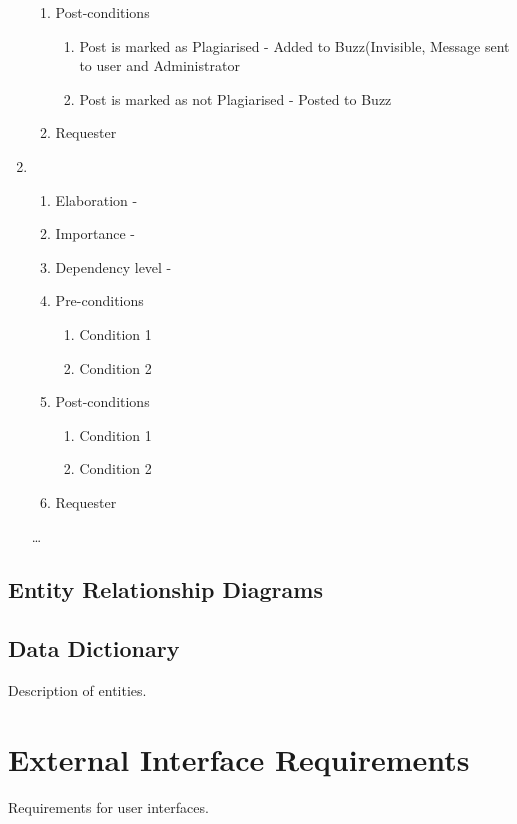 \documentclass[12pt]{article}
\begin{document}
\begin{enumerate}
\begin{enumerate}
        \item Post-conditions
    \begin{enumerate}
    	\item Post is marked as Plagiarised - Added to Buzz(Invisible, Message sent to user and Administrator
    	\item Post is marked as not Plagiarised - Posted to Buzz
    \end{enumerate}
    \item Requester
  \end{enumerate}
\newpage %
   \item  %
  \begin{enumerate}
    \item Elaboration - 
    \item Importance - 
    \item Dependency level - 
    \item Pre-conditions
    \begin{enumerate}
    	\item Condition 1
    	\item Condition 2
    \end{enumerate}
        \item Post-conditions
    \begin{enumerate}
    	\item Condition 1
    	\item Condition 2
    \end{enumerate}
    \item Requester
  \end{enumerate}
  \ldots
\end{enumerate}




\newpage

\subsection{Entity Relationship Diagrams}

\subsection{Data Dictionary}
Description of entities.

\section{External Interface Requirements}
Requirements for user interfaces.
\end{document}
